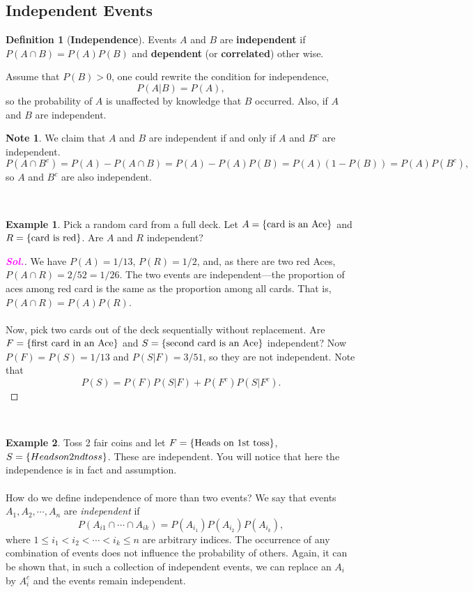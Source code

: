 \documentclass[12pt,a4paper]{article}
\theoremstyle{definition}
\newtheorem{example}{Example}[section]
\theoremstyle{definition}
\newtheorem*{definition}{Definition}
\theoremstyle{definition}
\theoremstyle{definition}
\theoremstyle{remark}
\theoremstyle{definition}
\newtheorem*{note}{Note}
\newcommand{\sol}{\textcolor{magenta}{\bf \textit{Sol.}}\quad}
\begin{document}
\subsection{Independent Events}
\begin{tcolorbox}[colback=white]
	\begin{definition}[\bf Independence]
		Events $A$ and $B$ are \textbf{independent} if $P(A\cap B)=P(A)P(B)$ and \textbf{dependent} (or \textbf{correlated}) other wise.
	\end{definition}
\end{tcolorbox} Assume that $P(B)>0$, one could rewrite the condition for independence, \[
P(A|B)=P(A),
\] so the probability of $A$ is unaffected by knowledge that $B$ occurred. Also, if $A$ and $B$ are independent.
\\
\begin{note}
	We claim that $A$ and $B$ are independent if and only if $A$ and $B^c$ are independent. \[
	P(A\cap B^c)=P(A)-P(A\cap B)=P(A)-P(A)P(B)=P(A)(1-P(B))=P(A)P(B^c),
	\] so $A$ and $B^c$ are also independent.
\end{note}
\
\begin{example}
	Pick a random card from a full deck. Let $A=\set{\text{card is an Ace}}$ and $R=\set{\text{card is red}}$. Are $A$ and $R$ independent?\begin{proof}[\sol]
		We have $P(A)=1/13$, $P(R)=1/2$, and, as there are two red Aces, $P(A\cap R)=2/52=1/26$. The two events are independent---the proportion of aces among red card is the same as the proportion among all cards. That is, $P(A\cap R)=P(A)P(R)$.\\
		\\
		Now, pick two cards out of the deck sequentially without replacement. Are $F=\set{\text{first card in an Ace}}$ and $S=\set{\text{second card is an Ace}}$ independent? Now $P(F)=P(S)=1/13$ and $P(S|F)=3/51$, so they are not independent. Note that \[
		P(S)=P(F)P(S|F)+P(F^c)P(S|F^c).
		\]
	\end{proof}
\end{example}
\
\begin{example}
	Toss 2 fair coins and let $F=\set{\text{Heads on 1st toss}}$, $S=\set{Heads on 2nd toss}$. These are independent. You will notice that here the independence is in fact and assumption.\\
	\\
	How do we define independence of more than two events? We say that events $A_1,A_2,\cdots, A_n$ are \textit{independent} if \[
	P(A_{i1}\cap\cdots\cap A_{ik})=P(A_{i_1})P(A_{i_2})P(A_{i_k}),
	\] where $1\leq i_1<i_2<\cdots<i_k\leq n$ are arbitrary indices. The occurrence of any combination of events does not influence the probability of others. Again, it can be shown that, in such a collection of independent events, we can replace an $A_i$ by $A_i^c$ and the events remain independent.
\end{example}
\end{document}
